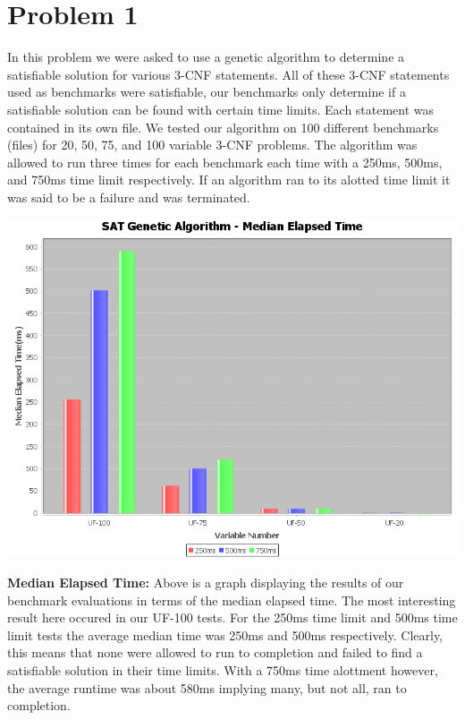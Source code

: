 \documentclass[10pt,a4paper]{article}
\begin{document}
	
	\section*{Problem 1}

	In this problem we were asked to use a genetic algorithm to determine a satisfiable solution for various 3-CNF statements. All of these 3-CNF statements used as benchmarks were satisfiable, our benchmarks only determine if a satisfiable solution can be found with certain time limits. Each statement was contained in its own file. We tested our algorithm on 100 different benchmarks (files) for 20, 50, 75, and 100 variable 3-CNF problems. The algorithm was allowed to run three times for each benchmark each time with a 250ms, 500ms, and 750ms time limit respectively. If an algorithm ran to its alotted time limit it was said to be a failure and was terminated.

	\begin{center}
		\includegraphics[scale=0.35]{median_time}
	\end{center}
	
	\textbf{Median Elapsed Time:} Above is a graph displaying the results of our benchmark evaluations in terms of the median elapsed time. The most interesting result here occured in our UF-100 tests. For the 250ms time limit and 500ms time limit tests the average median time was 250ms and 500ms respectively. Clearly, this means that none were allowed to run to completion and failed to find a satisfiable solution in their time limits. With a 750ms time alottment however, the average runtime was about 580ms implying many, but not all, ran to completion.
	
\end{document}
